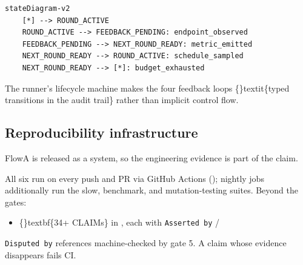\documentclass{article}
\begin{document}
\begin{verbatim}
stateDiagram-v2
    [*] --> ROUND_ACTIVE
    ROUND_ACTIVE --> FEEDBACK_PENDING: endpoint_observed
    FEEDBACK_PENDING --> NEXT_ROUND_READY: metric_emitted
    NEXT_ROUND_READY --> ROUND_ACTIVE: schedule_sampled
    NEXT_ROUND_READY --> [*]: budget_exhausted
\end{verbatim}
The runner's lifecycle machine makes the four feedback loops \{\}textit\{typed transitions in the audit trail\} rather than implicit control flow.

\subsection{Reproducibility infrastructure}
FlowA is released as a system, so the engineering evidence is part of the claim.

\begin{table}[ht]
\centering
\small
{}%
\end{table}

All six run on every push and PR via GitHub Actions (); nightly jobs additionally run the slow, benchmark, and mutation-testing suites. Beyond the gates:

\begin{itemize}
\item \{\}textbf\{34+ CLAIMs\} in , each with \texttt{Asserted by} /
\end{itemize}
\texttt{Disputed by} references machine-checked by gate 5. A claim whose evidence disappears fails CI.
\end{document}
